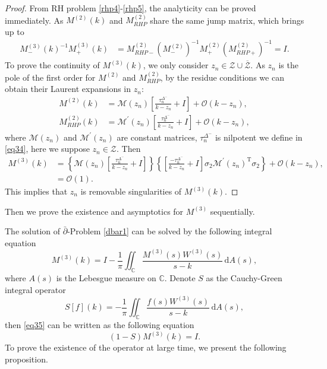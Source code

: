 \documentclass[11pt]{article}
\numberwithin{equation}{section}
\begin{document}
\begin{proof}
    From RH problem \ref{rhp4}-\ref{rhp5}, the analyticity can be proved immediately. As $M^{(2)}(k)$ and $M^{(2)}_{RHP}$ share the same jump matrix, which brings up to  \begin{align*}
        M_{-}^{(3)}(k)^{-1} M_{+}^{(3)}(k) &= M_{RHP-}^{(2)} \left(M_{-}^{(2)}\right)^{-1} M_{+}^{(2)} \left(M_{RHP+}^{(2)}\right)^{-1}= I.
    \end{align*}
    To prove the continuity of $M^{(3)}(k)$, we only consider $z_n\in\mathcal{Z}\cup\overline{\mathcal{Z}}$. As $z_n$ is the pole of the first order for $M^{(2)}$ and $ M_{RHP}^{(2)}$, by the residue conditions we can obtain their Laurent expansions in $z_n$:
    \begin{align*}
         M^{(2)}(k) &= \mathcal{M}(z_n) \left[ \frac{\tau^{\Delta^-}_n}{k - z_n} + I \right] + \mathcal{O}(k - z_n),\\
         M^{(2)}_{RHP}(k) &= \mathcal{M}^{\prime}(z_n) \left[ \frac{\tau^{\Delta^-}_n}{k -z_n} + I \right] + \mathcal{O}(k - z_n),
    \end{align*}
where $ \mathcal{M}(z_n)$ and $\mathcal{M}^{\prime}(z_n)$ are constant matrices, $\tau_n^{\Delta^-}$ is nilpotent we define in \eqref{eq34}, here we suppose $z_n\in\mathcal{Z}$. Then
\begin{align*}
    M^{(3)}(k) &= \left\{ \mathcal{M}(z_n) \left[ \frac{\tau^{\Delta^-}_n}{k - z_n} + I \right] \right\}
\left\{ \left[ \frac{-\tau^{\Delta^-}_n}{k - z_n} + I \right] \sigma_2 \mathcal{M}^{\prime}(z_n)^\mathrm{T} \sigma_2 \right\}
+ \mathcal{O}(k - z_n),\\
&= \mathcal{O}(1).
\end{align*}
This implies that $z_n$ is removable singularities of $M^{(3)}(k)$.
\end{proof}
Then we prove the existence and asymptotics for $M^{(3)}$ sequentially.

The solution of $\bar{\partial}$-Problem \ref{dbar1} can be solved by the following integral equation
\begin{equation}\label{eq35}
    M^{(3)}(k) = I - \frac{1}{\pi} \iint_\mathbb{C} \frac{M^{(3)}(s) W^{(3)}(s)}{s - k} \, \mathrm{d}A(s),
\end{equation}
where $A(s)$ is the Lebesgue measure on $\mathbb{C}$. Denote $S$ as the Cauchy-Green integral operator
\begin{equation}\label{eq36}
    S\left[f\right](k) = -\frac{1}{\pi} \iint_\mathbb{C} \frac{f(s) W^{(3)}(s)}{s - k} \, \mathrm{d}A(s),
\end{equation}
then \eqref{eq35} can be written as the following equation
\begin{equation}
    (1 - S)M^{(3)}(k) = I.
\end{equation}
To prove the existence of the operator at large time, we present the following proposition.
\end{document}
